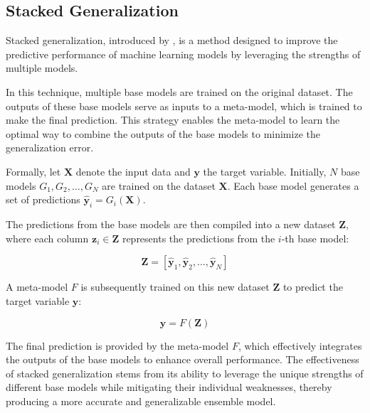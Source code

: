 \subsection{Stacked Generalization}
Stacked generalization, introduced by \citet{wolpertstacked_1992}, is a method designed to improve the predictive performance of machine learning models by leveraging the strengths of multiple models.

In this technique, multiple base models are trained on the original dataset.
The outputs of these base models serve as inputs to a meta-model, which is trained to make the final prediction.
This strategy enables the meta-model to learn the optimal way to combine the outputs of the base models to minimize the generalization error.

Formally, let $\mathbf{X}$ denote the input data and $\mathbf{y}$ the target variable.
Initially, $N$ base models $G_1, G_2, \ldots, G_N$ are trained on the dataset $\mathbf{X}$.
Each base model generates a set of predictions $\hat{\mathbf{y}}_i = G_i(\mathbf{X})$.

The predictions from the base models are then compiled into a new dataset $\mathbf{Z}$, where each column $\mathbf{z}_i \in \mathbf{Z}$ represents the predictions from the $i$-th base model:

$$
\mathbf{Z} = [\hat{\mathbf{y}}_1, \hat{\mathbf{y}}_2, \ldots, \hat{\mathbf{y}}_N]
$$

A meta-model $F$ is subsequently trained on this new dataset $\mathbf{Z}$ to predict the target variable $\mathbf{y}$:

$$
\mathbf{\hat{y}} = F(\mathbf{Z})
$$

The final prediction is provided by the meta-model $F$, which effectively integrates the outputs of the base models to enhance overall performance.
The effectiveness of stacked generalization stems from its ability to leverage the unique strengths of different base models while mitigating their individual weaknesses, thereby producing a more accurate and generalizable ensemble model.
